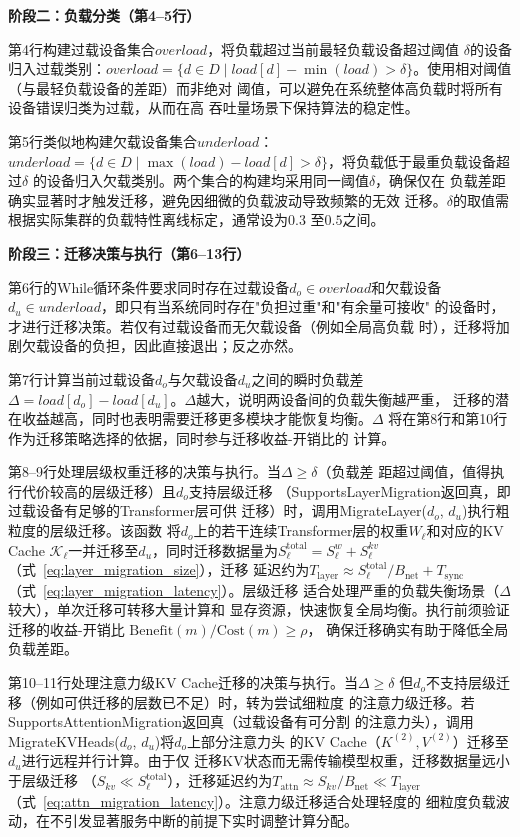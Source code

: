 \begin{enumerate}
\textbf{阶段二：负载分类（第4--5行）}

第4行构建过载设备集合$overload$，将负载超过当前最轻负载设备超过阈值
$\delta$的设备归入过载类别：$overload = \{d \in D \mid load[d] -
\min(load) > \delta\}$。使用相对阈值（与最轻负载设备的差距）而非绝对
阈值，可以避免在系统整体高负载时将所有设备错误归类为过载，从而在高
吞吐量场景下保持算法的稳定性。

第5行类似地构建欠载设备集合$underload$：$underload = \{d \in D \mid
\max(load) - load[d] > \delta\}$，将负载低于最重负载设备超过$\delta$
的设备归入欠载类别。两个集合的构建均采用同一阈值$\delta$，确保仅在
负载差距确实显著时才触发迁移，避免因细微的负载波动导致频繁的无效
迁移。$\delta$的取值需根据实际集群的负载特性离线标定，通常设为$0.3$
至$0.5$之间。

\textbf{阶段三：迁移决策与执行（第6--13行）}

第6行的While循环条件要求同时存在过载设备$d_o \in overload$和欠载设备
$d_u \in underload$，即只有当系统同时存在"负担过重"和"有余量可接收"
的设备时，才进行迁移决策。若仅有过载设备而无欠载设备（例如全局高负载
时），迁移将加剧欠载设备的负担，因此直接退出；反之亦然。

第7行计算当前过载设备$d_o$与欠载设备$d_u$之间的瞬时负载差$\Delta =
load[d_o] - load[d_u]$。$\Delta$越大，说明两设备间的负载失衡越严重，
迁移的潜在收益越高，同时也表明需要迁移更多模块才能恢复均衡。$\Delta$
将在第8行和第10行作为迁移策略选择的依据，同时参与迁移收益-开销比的
计算。

第8--9行处理层级权重迁移的决策与执行。当$\Delta \geq \delta$（负载差
距超过阈值，值得执行代价较高的层级迁移）且$d_o$支持层级迁移
（SupportsLayerMigration返回真，即过载设备有足够的Transformer层可供
迁移）时，调用MigrateLayer($d_o$, $d_u$)执行粗粒度的层级迁移。该函数
将$d_o$上的若干连续Transformer层的权重$W_\ell$和对应的KV Cache
$\mathcal{K}_\ell$一并迁移至$d_u$，同时迁移数据量为$S^{\text{total}}_\ell
= S^w_\ell + S^{kv}_\ell$（式~\eqref{eq:layer_migration_size}），迁移
延迟约为$T_{\text{layer}} \approx S^{\text{total}}_\ell / B_{\text{net}}
+ T_{\text{sync}}$（式~\eqref{eq:layer_migration_latency}）。层级迁移
适合处理严重的负载失衡场景（$\Delta$较大），单次迁移可转移大量计算和
显存资源，快速恢复全局均衡。执行前须验证迁移的收益-开销比
$\text{Benefit}(m)/\text{Cost}(m) \geq \rho$，
确保迁移确实有助于降低全局负载差距。

第10--11行处理注意力级KV Cache迁移的决策与执行。当$\Delta \geq \delta$
但$d_o$不支持层级迁移（例如可供迁移的层数已不足）时，转为尝试细粒度
的注意力级迁移。若SupportsAttentionMigration返回真（过载设备有可分割
的注意力头），调用MigrateKVHeads($d_o$, $d_u$)将$d_o$上部分注意力头
的KV Cache（$K^{(2)}, V^{(2)}$）迁移至$d_u$进行远程并行计算。由于仅
迁移KV状态而无需传输模型权重，迁移数据量远小于层级迁移
（$S_{kv} \ll S^{\text{total}}_\ell$），迁移延迟约为$T_{\text{attn}}
\approx S_{kv}/B_{\text{net}} \ll T_{\text{layer}}$
（式~\eqref{eq:attn_migration_latency}）。注意力级迁移适合处理轻度的
细粒度负载波动，在不引发显著服务中断的前提下实时调整计算分配。


\end{enumerate}
